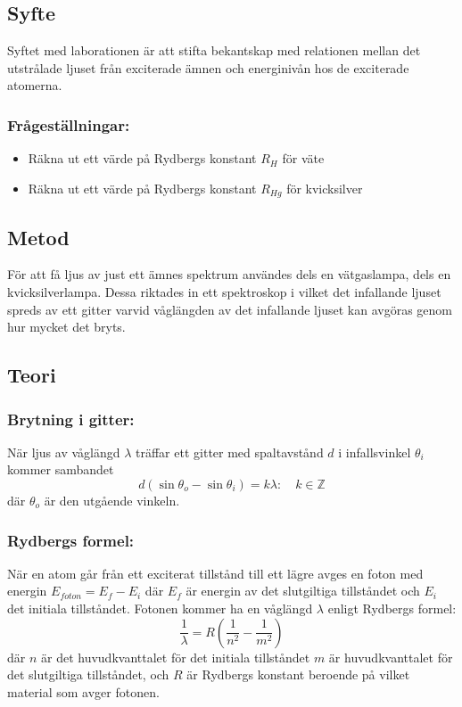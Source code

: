 \subsection*{Syfte}
Syftet med laborationen är att stifta bekantskap med relationen mellan det utstrålade ljuset från exciterade ämnen och energinivån hos de exciterade atomerna.
\subsubsection*{Frågeställningar:}
\begin{itemize}
	\item Räkna ut ett värde på Rydbergs konstant $R_H$ för väte
    \item Räkna ut ett värde på Rydbergs konstant $R_{Hg}$ för kvicksilver
\end{itemize}

\subsection*{Metod}
För att få ljus av just ett ämnes spektrum användes dels en vätgaslampa, dels en kvicksilverlampa. Dessa riktades in ett spektroskop i vilket det infallande ljuset spreds av ett gitter varvid våglängden av det infallande ljuset kan avgöras genom hur mycket det bryts.

\subsection*{Teori}
\subsubsection*{Brytning i gitter:}
När ljus av våglängd $\lambda$ träffar ett gitter med spaltavstånd $d$ i infallsvinkel $\theta_i$ kommer sambandet 
\begin{equation}
	d\left(\sin\theta_o-\sin\theta_i\right)=k\lambda: \quad k\in\mathbb{Z}
    \label{eq_gitterbrytning}
\end{equation}
där $\theta_o$ är den utgående vinkeln.

\subsubsection*{Rydbergs formel:}
När en atom går från ett exciterat tillstånd till ett lägre avges en foton med energin $E_{foton}=E_f-E_i$ där $E_f$ är energin av det slutgiltiga tillståndet och $E_i$ det initiala tillståndet. Fotonen kommer ha en våglängd $\lambda$ enligt Rydbergs formel:
\begin{equation}
	\frac{1}{\lambda}=R\left(\frac{1}{n^2}-\frac{1}{m^2}\right)
    \label{eq_Rydbergs_formel}
\end{equation}
där $n$ är det huvudkvanttalet för det initiala tillståndet $m$ är huvudkvanttalet för det slutgiltiga tillståndet, och $R$ är Rydbergs konstant beroende på vilket material som avger fotonen.